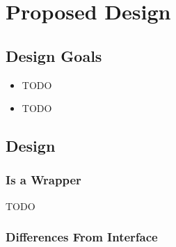 \section{Proposed Design}

\subsection{Design Goals}

\begin{itemize}
  \item TODO

  \item TODO
\end{itemize}

\subsection{Design}

\subsubsection{ Is a Wrapper}

TODO

\subsubsection{Differences From  Interface}


